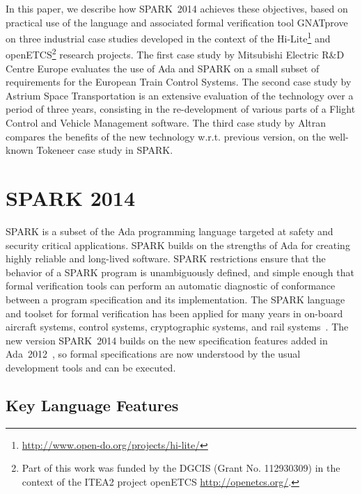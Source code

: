 \documentclass[10pt,a4paper,twocolumn]{article}
\newcommand{\hilite}{Hi-Lite\xspace}
\newcommand{\openetcs}{openETCS\xspace}
\newcommand{\gnatprove}{GNATprove\xspace}
\newcommand{\newspark}{SPARK~2014\xspace}
\newcommand{\adatwtw}{Ada~2012\xspace}
\newcommand{\wrt}{w.r.t.\xspace}
\begin{document}
In this paper, we describe how \newspark achieves these objectives,
based on practical use of the language and associated formal
verification tool \gnatprove on three industrial case studies
developed in the context of the
\hilite\footnote{\url{http://www.open-do.org/projects/hi-lite/}} and
\openetcs\footnote{Part of this work was funded by the DGCIS (Grant
  No. 112930309) in the context of the ITEA2 project \openetcs
  \url{http://openetcs.org/}.} research projects. The first case study
by Mitsubishi Electric R\&D Centre Europe evaluates the use of Ada and
SPARK on a small subset of requirements for the European Train Control
Systems. The second case study by Astrium Space Transportation is an
extensive evaluation of the technology over a period of three years,
consisting in the re-development of various parts of a Flight Control
and Vehicle Management software. The third case study by Altran
compares the benefits of the new technology \wrt previous version, on
the well-known Tokeneer case study in SPARK.

\section{SPARK 2014}


SPARK is a subset of the Ada programming language targeted at safety
and security critical applications. SPARK builds on the strengths of
Ada for creating highly reliable and long-lived software. SPARK
restrictions ensure that the behavior of a SPARK program is
unambiguously defined, and simple enough that formal verification
tools can perform an automatic diagnostic of conformance between a
program specification and its implementation. The SPARK language and
toolset for formal verification has been applied for many years in
on-board aircraft systems, control systems, cryptographic systems, and
rail systems~\cite{sparkbook2012,oneill2012}. The new version
\newspark builds on the new specification features added in
\adatwtw~\cite{ada2012rationale}, so formal specifications are now
understood by the usual development tools and can be executed.

\subsection{Key Language Features}
\end{document}
